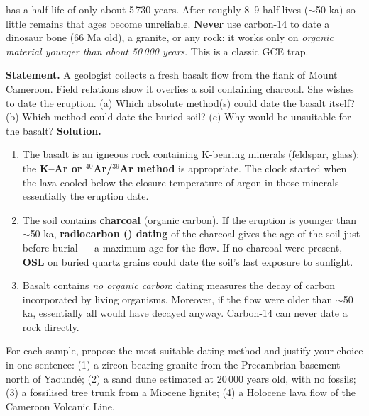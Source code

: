 \documentclass[11pt]{article}
\begin{document}
\begin{attention}
 has a half-life of only about 5\,730 years. After roughly 8--9 half-lives ($\sim$50 ka) so little  remains that ages become unreliable. \textbf{Never} use carbon-14 to date a dinosaur bone (66 Ma old), a granite, or any rock: it works only on \emph{organic material younger than about 50\,000 years}. This is a classic GCE trap.
\end{attention}

\begin{exoresolu}
\textbf{Statement.} A geologist collects a fresh basalt flow from the flank of Mount Cameroon. Field relations show it overlies a soil containing charcoal. She wishes to date the eruption. (a) Which absolute method(s) could date the basalt itself? (b) Which method could date the buried soil? (c) Why would  be unsuitable for the basalt?
\tcblower
\textbf{Solution.}
\begin{enumerate}
\item[(a)] The basalt is an igneous rock containing K-bearing minerals (feldspar, glass): the \textbf{K--Ar or $^{40}$Ar/$^{39}$Ar method} is appropriate. The clock started when the lava cooled below the closure temperature of argon in those minerals --- essentially the eruption date.
\item[(b)] The soil contains \textbf{charcoal} (organic carbon). If the eruption is younger than $\sim$50 ka, \textbf{radiocarbon () dating} of the charcoal gives the age of the soil just before burial --- a maximum age for the flow. If no charcoal were present, \textbf{OSL} on buried quartz grains could date the soil's last exposure to sunlight.
\item[(c)] Basalt contains \emph{no organic carbon}:  dating measures the decay of carbon incorporated by living organisms. Moreover, if the flow were older than $\sim$50 ka, essentially all  would have decayed anyway. Carbon-14 can never date a rock directly.
\end{enumerate}
\end{exoresolu}

\begin{exercice}
For each sample, propose the most suitable dating method and justify your choice in one sentence: (1) a zircon-bearing granite from the Precambrian basement north of Yaound\'e; (2) a sand dune estimated at 20\,000 years old, with no fossils; (3) a fossilised tree trunk from a Miocene lignite; (4) a Holocene lava flow of the Cameroon Volcanic Line.
\end{exercice}
\end{document}
